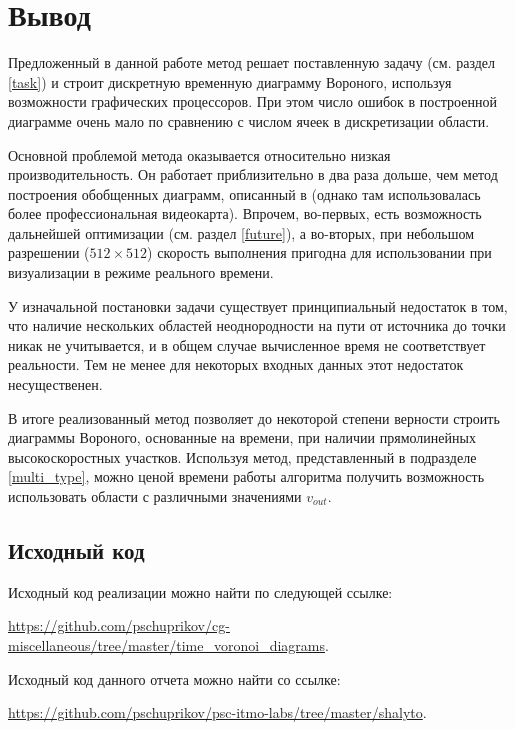 \documentclass[12pt]{article}
\begin{document}
\section{Вывод}
Предложенный в данной работе метод решает поставленную задачу (см. раздел \ref{task})
и строит дискретную временную диаграмму Вороного, используя возможности графических
процессоров. При этом число ошибок в построенной диаграмме очень мало по 
сравнению с числом ячеек в дискретизации области. 

Основной проблемой метода оказывается относительно низкая производительность. 
Он работает приблизительно в два раза дольше, чем метод построения обобщенных диаграмм, 
описанный в \cite{gvd} (однако там использовалась более профессиональная видеокарта). 
Впрочем, во-первых, есть возможность дальнейшей оптимизации
(см. раздел \ref{future}), а во-вторых, при небольшом разрешении ($512\times512$)
скорость выполнения пригодна для использовании при визуализации в режиме
реального времени.

У изначальной постановки задачи существует принципиальный недостаток в том, 
что наличие нескольких областей неоднородности на пути от источника до точки
никак не учитывается, и в общем случае вычисленное время не соответствует 
реальности. Тем не менее для некоторых входных данных этот недостаток несущественен.

В итоге реализованный метод позволяет до некоторой степени верности строить
диаграммы Вороного, основанные на времени, при наличии 
прямолинейных высокоскоростных участков. Используя метод, 
представленный в подразделе \ref{multi_type}, можно ценой времени работы
алгоритма получить возможность использовать области с различными 
значениями $v_{out}$.
\pagebreak

\begin{appendix}
\section{Исходный код}
\label{source}
Исходный код реализации можно найти по следующей ссылке: 

\url{https://github.com/pschuprikov/cg-miscellaneous/tree/master/time_voronoi_diagrams}.

Исходный код данного отчета можно найти со ссылке:

\url{https://github.com/pschuprikov/psc-itmo-labs/tree/master/shalyto}.

\end{appendix}
\end{document}
